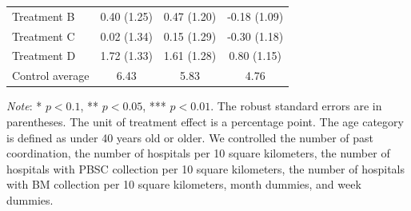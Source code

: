 \documentclass[12pt, a4paper]{article}
\begin{document}
\begin{table}[H]
\begin{threeparttable}
\begin{tabular}[t]{lccc}
\hspace{1em}Treatment B & 0.40 (1.25) & 0.47 (1.20) & -0.18 (1.09)\\
\hspace{1em}Treatment C & 0.02 (1.34) & 0.15 (1.29) & -0.30 (1.18)\\
\hspace{1em}Treatment D & 1.72 (1.33) & 1.61 (1.28) & 0.80 (1.15)\\
\hspace{1em}Control average & 6.43 & 5.83 & 4.76\\
\bottomrule
\end{tabular}
\begin{tablenotes}
\item \emph{Note}: * $p < 0.1$, ** $p < 0.05$, *** $p < 0.01$. The robust standard errors are in parentheses. The unit of treatment effect is a percentage point. The age category is defined as under 40 years old or older. We controlled the number of past coordination, the number of hospitals per 10 square kilometers, the number of hospitals with PBSC collection per 10 square kilometers, the number of hospitals with BM collection per 10 square kilometers, month dummies, and week dummies.
\end{tablenotes}
\end{threeparttable}
\end{table}

\clearpage


\end{document}
